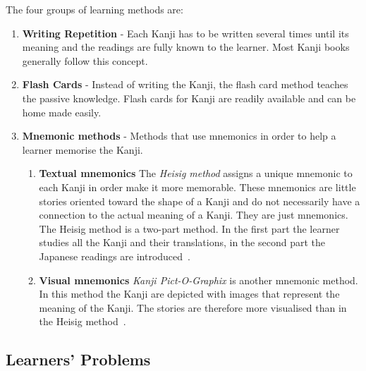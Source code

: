 The four groups of learning methods are:
\begin{enumerate}
  \item \textbf{Writing Repetition} - Each Kanji has to be written several times
        until its meaning and the readings are fully known to the learner.
        Most Kanji books generally follow this concept.

  \item \textbf{Flash Cards} - Instead of writing the Kanji, the flash card 
        method teaches the passive knowledge. Flash cards for Kanji are readily
        available and can be home made easily.

  \item \textbf{Mnemonic methods} - Methods that use mnemonics in order to help
        a learner memorise the Kanji.
        \begin{enumerate}
          \item \textbf{Textual mnemonics} The \emph{Heisig method} assigns a 
                unique mnemonic to each Kanji in order make it more memorable. 
                These mnemonics are little stories oriented toward the shape
                of a Kanji and do not necessarily have a connection to the 
                actual meaning of a Kanji. They are just mnemonics. 
                The Heisig method is a two-part method. In the first part
                the learner studies all the Kanji and their translations, 
                in the second part the Japanese readings are 
                introduced~.

          \item \textbf{Visual mnemonics} \emph{Kanji Pict-O-Graphix} is 
                another mnemonic method. In this method the Kanji are 
                depicted with images that represent the meaning of the Kanji.
                The stories are therefore more visualised than in the Heisig 
                method~.
          \end{enumerate}
\end{enumerate}


\subsection{Learners' Problems}
\label{sec:learnersproblems}

